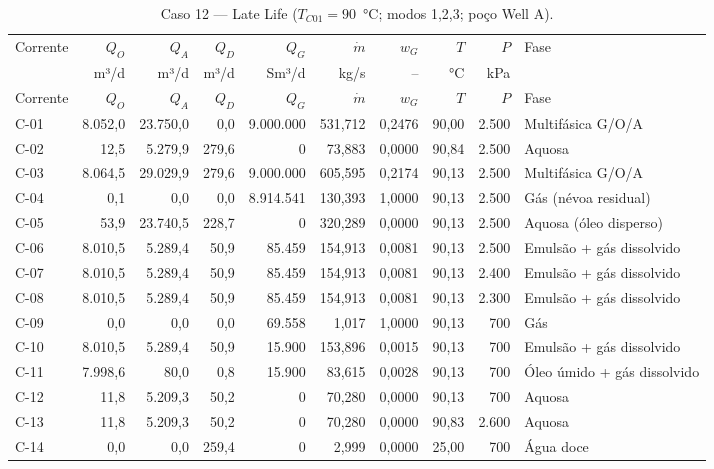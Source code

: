 \documentclass[11pt,a4paper]{article}
\numberwithin{equation}{section}
\numberwithin{table}{section}
\numberwithin{figure}{section}
\begin{document}
{\footnotesize\setlength{\tabcolsep}{3pt}\begin{longtable}{lrrrrrrrrL{2.5cm}}
\caption{Caso 12 --- Late Life ($T_{C01}=90$~°C; modos 1,2,3; poço Well A).}\\\toprule
Corrente & $Q_O$ & $Q_A$ & $Q_D$ & $Q_G$ & $\dot m$ & $w_G$ & $T$ & $P$ & Fase\\ & m³/d & m³/d & m³/d & Sm³/d & kg/s & -- & °C & kPa & \\\midrule\endfirsthead
\toprule Corrente & $Q_O$ & $Q_A$ & $Q_D$ & $Q_G$ & $\dot m$ & $w_G$ & $T$ & $P$ & Fase\\\midrule\endhead
C-01 & 8.052,0 & 23.750,0 & 0,0 & 9.000.000 & 531,712 & 0,2476 & 90,00 & 2.500 & {\scriptsize Multifásica G/O/A}\\
C-02 & 12,5 & 5.279,9 & 279,6 & 0 & 73,883 & 0,0000 & 90,84 & 2.500 & {\scriptsize Aquosa}\\
C-03 & 8.064,5 & 29.029,9 & 279,6 & 9.000.000 & 605,595 & 0,2174 & 90,13 & 2.500 & {\scriptsize Multifásica G/O/A}\\
C-04 & 0,1 & 0,0 & 0,0 & 8.914.541 & 130,393 & 1,0000 & 90,13 & 2.500 & {\scriptsize Gás (névoa residual)}\\
C-05 & 53,9 & 23.740,5 & 228,7 & 0 & 320,289 & 0,0000 & 90,13 & 2.500 & {\scriptsize Aquosa (óleo disperso)}\\
C-06 & 8.010,5 & 5.289,4 & 50,9 & 85.459 & 154,913 & 0,0081 & 90,13 & 2.500 & {\scriptsize Emulsão + gás dissolvido}\\
C-07 & 8.010,5 & 5.289,4 & 50,9 & 85.459 & 154,913 & 0,0081 & 90,13 & 2.400 & {\scriptsize Emulsão + gás dissolvido}\\
C-08 & 8.010,5 & 5.289,4 & 50,9 & 85.459 & 154,913 & 0,0081 & 90,13 & 2.300 & {\scriptsize Emulsão + gás dissolvido}\\
C-09 & 0,0 & 0,0 & 0,0 & 69.558 & 1,017 & 1,0000 & 90,13 & 700 & {\scriptsize Gás}\\
C-10 & 8.010,5 & 5.289,4 & 50,9 & 15.900 & 153,896 & 0,0015 & 90,13 & 700 & {\scriptsize Emulsão + gás dissolvido}\\
C-11 & 7.998,6 & 80,0 & 0,8 & 15.900 & 83,615 & 0,0028 & 90,13 & 700 & {\scriptsize Óleo úmido + gás dissolvido}\\
C-12 & 11,8 & 5.209,3 & 50,2 & 0 & 70,280 & 0,0000 & 90,13 & 700 & {\scriptsize Aquosa}\\
C-13 & 11,8 & 5.209,3 & 50,2 & 0 & 70,280 & 0,0000 & 90,83 & 2.600 & {\scriptsize Aquosa}\\
C-14 & 0,0 & 0,0 & 259,4 & 0 & 2,999 & 0,0000 & 25,00 & 700 & {\scriptsize Água doce}\\

\end{longtable}}
\end{document}
